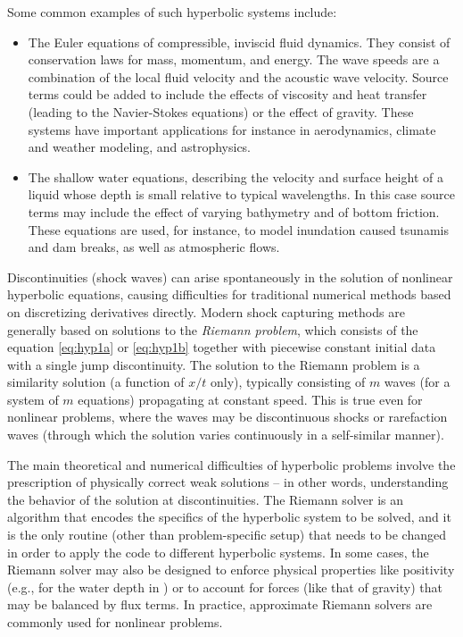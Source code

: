 Some common examples of such hyperbolic systems include:
\begin{itemize}
    \item The Euler equations of compressible, inviscid fluid dynamics.
        They consist of conservation laws for mass, momentum, and energy.
        The wave speeds are a combination of the local fluid velocity
        and the acoustic wave velocity.  Source terms could be added
        to include the effects of viscosity and heat transfer
        (leading to the Navier-Stokes equations) or the effect of gravity.
        These systems have important applications for instance in
        aerodynamics, climate and weather modeling, and astrophysics.
    \item The shallow water equations, describing the velocity and
        surface height of a liquid whose depth is small relative to
        typical wavelengths.  In this case source terms may include
        the effect of varying bathymetry and of bottom friction.
        These equations are used, for instance, to model inundation
        caused tsunamis and dam breaks, as well as atmospheric flows.
\end{itemize}

Discontinuities (shock waves) can arise spontaneously in the solution of nonlinear
hyperbolic equations, causing difficulties for
traditional numerical methods based on discretizing derivatives
directly.   Modern shock capturing methods are generally based on solutions
to the {\em Riemann problem}, which consists of the equation 
\cref{eq:hyp1a} or \cref{eq:hyp1b}
together with piecewise constant initial data with a single jump discontinuity.
The solution to the Riemann problem is a similarity
solution (a function of $x/t$ only),
typically consisting of $m$ waves (for a system of $m$ equations)
propagating at constant speed.  This is true even for nonlinear problems,
where the waves may be discontinuous shocks or rarefaction waves
(through which the solution varies continuously in a self-similar manner).

The main theoretical
and numerical difficulties of hyperbolic problems involve the prescription of
physically correct weak solutions -- in other words, understanding the behavior
of the solution at discontinuities.  The Riemann solver is an algorithm that
encodes the specifics of the hyperbolic system to be solved, and it is the only
routine (other than problem-specific setup) that needs to be changed in order
to apply the code to different hyperbolic systems.  In some cases, the Riemann
solver may also be designed to enforce physical properties like positivity
(e.g., for the water depth in \geoclaw) or to account for forces (like that
of gravity) that may be balanced by flux terms.
In practice, approximate Riemann solvers are commonly used for nonlinear
problems.%


